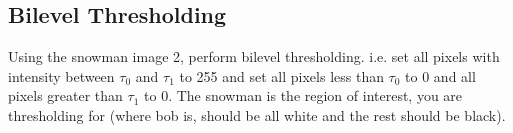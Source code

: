 \subsection{Bilevel Thresholding}
Using the snowman image 2, perform bilevel thresholding. i.e. set all
pixels with intensity between $\tau_0$ and $\tau_1$ to 255 and set all pixels
less than $\tau_0$ 
to 0 and all pixels greater than $\tau_1$ to 0. The snowman is the region of interest,
you are thresholding for (where bob is, should be all white and the rest should
be black).




